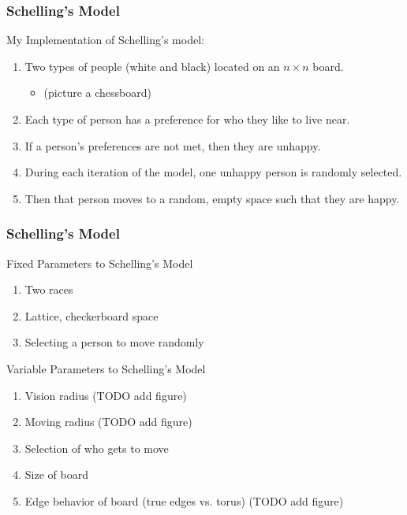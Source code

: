 \documentclass[11pt, handout]{beamer}
\begin{document}
\begin{frame}
    \frametitle{Schelling's Model}
    My Implementation of Schelling's model:
    \begin{enumerate}
        \item Two types of people (white and black) located on an $n \times n$ board.
            \begin{itemize}
                \item (picture a chessboard)
            \end{itemize}
        \item Each type of person has a preference for who they like to live near.
        \item If a person's preferences are not met, then they are unhappy.
        \item During each iteration of the model, one unhappy person is randomly selected.
        \item Then that person moves to a random, empty space such that they are happy.
    \end{enumerate}
\end{frame}

\begin{frame}
    \frametitle{Schelling's Model}
    Fixed Parameters to Schelling's Model
    \begin{enumerate}
        \item Two races
        \item Lattice, checkerboard space
        \item Selecting a person to move randomly
    \end{enumerate}
    Variable Parameters to Schelling's Model
    \begin{enumerate}
        \item Vision radius (TODO add figure)
        \item Moving radius (TODO add figure)
        \item Selection of who gets to move
        \item Size of board
        \item Edge behavior of board (true edges vs. torus) (TODO add figure)
    \end{enumerate}
\end{frame}
\end{document}
